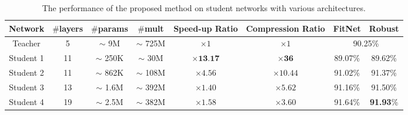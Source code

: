 \documentclass[journal]{IEEEtran}
\begin{document}
\begin{table*}[htb]
\setlength{\abovecaptionskip}{0.2cm}
\setlength{\belowcaptionskip}{0.2cm}
\renewcommand\arraystretch{1}
\centering
\small
\caption{The performance of the proposed method on student networks with various architectures.}
\begin{tabular}{|c|c|c|c|c|c|c|c|}
\hline
\textbf{Network}  &  \textbf{$\#$\textbf{layers}}  &  \textbf{$\#$\textbf{params}}  &  \textbf{$\#$\textbf{mult}}  &  \textbf{\textbf{Speed-up Ratio}}  &  \textbf{\textbf{Compression Ratio}}  &  \textbf{\textbf{FitNet}}  &  \textbf{\textbf{Robust}}\\
\hline
\hline
Teacher  &  5  &  $\sim$ 9M  &  $\sim$ 725M  &  $\times 1$  &  $\times 1$  &  \multicolumn{2}{c|}{ 90.25\%}    \\
\hline
Student 1  &  11  &  $\sim$ 250K  &  $\sim$ 30M  &  $\times \textbf{13.17}$  &  $\times \textbf{36}$  &  89.07\%  &  89.62\%    \\
\hline
Student 2  &  11  &  $\sim$ 862K  &  $\sim$ 108M  &  $\times 4.56$  &  $\times 10.44$  &  91.02\%  &  91.37\%    \\
\hline
Student 3  &  13  &  $\sim$ 1.6M  &  $\sim$ 392M  &  $\times 1.40$  &  $\times 5.62$  &  91.16\%  &  91.50\%    \\
\hline
Student 4  &  19  &  $\sim$ 2.5M  &  $\sim$ 382M  &  $\times 1.58$  &  $\times 3.60$  &  91.64\%  &  \textbf{91.93}\%    \\
\hline
\end{tabular}
\label{tab_students_result}
\end{table*} 
\end{document}

